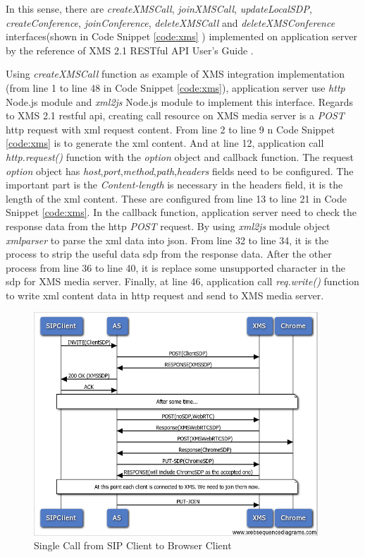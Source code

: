 \par In this sense, there are \textit{createXMSCall}, \textit{joinXMSCall}, \textit{updateLocalSDP}, \textit{createConference}, \textit{joinConference}, \textit{deleteXMSCall} and \textit{deleteXMSConference} interfaces(shown in Code Snippet \ref{code:xms} ) implemented on application server by the reference of XMS 2.1 RESTful API User's Guide \cite{doc:xms_webapi}.

\par Using \textit{createXMSCall} function as example of XMS integration implementation (from line 1 to line 48 in Code Snippet \ref{code:xms}), application server use \textit{http} Node.js module and \textit{xml2js} Node.js module to implement this interface. Regards to XMS 2.1 \gls{rest}ful \gls{api}, creating call resource on XMS media server is a \textit{POST} \gls{http} request with \gls{xml} request content. From line 2 to line 9 n Code Snippet \ref{code:xms} is to generate the \gls{xml} content. And at line 12, application call \textit{http.request()} function with the \textit{option} object and callback function. The request \textit{option} object has \textit{host},\textit{port},\textit{method},\textit{path},\textit{headers} fields need to be configured. The important part is the \textit{Content-length} is necessary in the headers field, it is the length of the \gls{xml} content. These are configured from line 13 to line 21 in Code Snippet \ref{code:xms}. In the callback function, application server need to check the response data from the \gls{http} \textit{POST} request. By using \textit{xml2js} module object \textit{xmlparser} to parse the \gls{xml} data into \gls{json}. From line 32 to line 34, it is the process to strip the useful data \gls{sdp} from the response data. After the other process from line 36 to line 40, it is replace some unsupported character in the \gls{sdp} for XMS media server. Finally, at line 46, application call \textit{req.write()} function to write \gls{xml} content data in \gls{http} request and send to XMS media server.

\begin{figure}
	\centering
    	\includegraphics[width=0.95\textwidth,natwidth=610,natheight=642]{figs/sip2xms.png}
  	\caption{Single Call from SIP Client to Browser Client}
  	\label{fig:sip2xms}
\end{figure}

